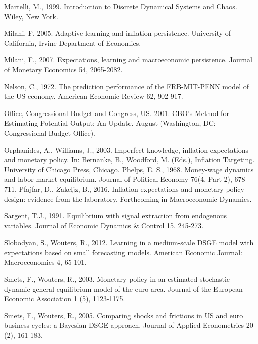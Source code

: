 \begin{thebibliography}{}
 Martelli, M., 1999. Introduction to Discrete Dynamical
Systems and Chaos.  Wiley, New York.


\bibitem{} Milani, F. 2005. Adaptive learning and inflation persistence. University of California, Irvine-Department of Economics.


 Milani, F., 2007. Expectations, learning and
macroeconomic persistence. Journal of Monetary Economics 54,
2065-2082.



Nelson, C., 1972. The prediction performance of the FRB-MIT-PENN model of the US economy. American Economic Review 62, 902-917.

 {Office, Congressional Budget and Congress, US. 2001.
CBO’s Method for Estimating Potential Output: An Update.
{August (Washington, DC: Congressional Budget Office)}.



%
\bibitem{} Orphanides, A., Williams, J., 2003.
Imperfect knowledge, inflation expectations and monetary policy.
In: Bernanke, B., Woodford, M. (Eds.), Inflation Targeting. University of Chicago Press, Chicago.
%
\bibitem{} Phelps, E. S., 1968. Money-wage dynamics and labor-market
equilibrium. Journal of Political Economy 76(4, Part 2), 678-711.
%
\bibitem{} Pfajfar, D., $\check{{Z}}$akeljz, B., 2016. Inflation expectations and monetary policy design:
 evidence from the laboratory. Forthcoming in Macroeconomic Dynamics.

Sargent, T.J., 1991. Equilibrium with signal extraction from endogenous variables. Journal
of Economic Dynamics \& Control 15, 245-273.



%

\bibitem{} Slobodyan, S., Wouters, R., 2012.
Learning in a medium-scale DSGE model with expectations based on small forecasting models.
{American Economic Journal: Macroeconomics} 4, 65-101.

\bibitem{} Smets, F., Wouters, R., 2003. Monetary policy in an estimated
stochastic dynamic general equilibrium model of the euro area.
Journal of the European Economic Association 1 (5), 1123-1175.

\bibitem{} Smets, F., Wouters, R., 2005. Comparing shocks and frictions in US
and euro business cycles: a Bayesian DSGE approach. Journal of
Applied Econometrics 20 (2), 161-183.

}
\end{thebibliography}
